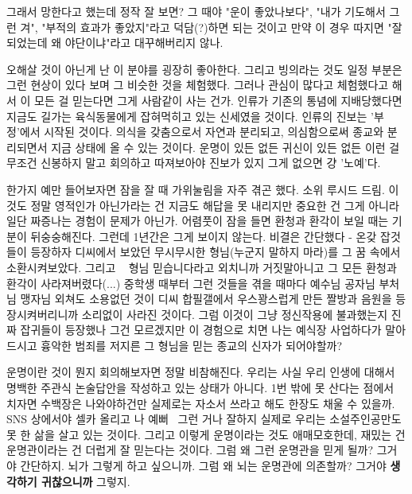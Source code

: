 그래서 망한다고 했는데 정작 잘 보면?
그 때야 "운이 좋았나보다", "내가 기도해서 그런 겨", "부적의 효과가 좋았지"라고 덕담(?)하면 되는 것이고
만약 이 경우 따지면 "잘되었는데 왜 야단이냐"라고 대꾸해버리지 않나.
\vspace{5mm}

오해살 것이 아닌게 난 이 분야를 굉장히 좋아한다. 그리고 빙의라는 것도 일정 부분은 그런 현상이 있다 보며
그 비슷한 것을 체험했다.
그러나 관심이 많다고 체험했다고 해서 이 모든 걸 믿는다면 그게 사람같이 사는 건가.
인류가 기존의 통념에 지배당했다면 지금도 길가는 육식동물에게 잡혀먹히고 있는 신세였을 것이다.
인류의 진보는 '부정'에서 시작된 것이다. 의식을 갖춤으로서 자연과 분리되고, 의심함으로써 종교와 분리되면서 지금 상태에 올 수 있는 것이다.
운명이 있든 없든 귀신이 있든 없든 이런 걸 무조건 신봉하지 말고 회의하고 따져보아야 진보가 있지 그게 없으면 걍 '노예'다.
\vspace{5mm}

한가지 예만 들어보자면 잠을 잘 때 가위눌림을 자주 겪곤 했다. 소위 루시드 드림.
이것도 정말 영적인가 아닌가라는 건 지금도 해답을 못 내리지만 중요한 건 그게 아니라 일단 짜증나는 경험이 문제가 아닌가.
어렴풋이 잠을 들면 환청과 환각이 보일 때는 기분이 뒤숭숭해진다.
그런데 1년간은 그게 보이지 않는다. 비결은 간단했다 - 온갖 잡것들이 등장하자 디씨에서 보았던 무시무시한 형님(누군지 말하지 마라)를
그 꿈 속에서 소환시켜보았다. 그리고 ~ 형님 믿습니다라고 외치니까 거짓말아니고 그 모든 환청과 환각이 사라져버렸다(...)
중학생 때부터 그런 것들을 겪을 때마다 예수님 공자님 부처님 맹자님 외쳐도 소용없던 것이
디씨 합필갤에서 우스꽝스럽게 만든 짤방과 음원을 등장시켜버리니까 소리없이 사라진 것이다.
그럼 이것이 그냥 정신작용에 불과했는지 진짜 잡귀들이 등장했나 그건 모르겠지만
이 경험으로 치면 나는 예식장 사업하다가 말아드시고 흉악한 범죄를 저지른 그 형님을 믿는 종교의 신자가 되어야할까?
\vspace{5mm}

운명이란 것이 뭔지 회의해보자면 정말 비참해진다.
우리는 사실 우리 인생에 대해서 명백한 주관식 논술답안을 작성하고 있는 상태가 아니다.
1번 밖에 못 산다는 점에서 치자면 수백장은 나와야하건만 실제로는 자소서 쓰라고 해도 한장도 채울 수 있을까.
SNS 상에서야 셀카 올리고 나 예뻐~ 그런 거나 잘하지 실제로 우리는 소설주인공만도 못 한 삶을 살고 있는 것이다.
그리고 이렇게 운명이라는 것도 애매모호한데, 재밌는 건 운명관이라는 건 더럽게 잘 믿는다는 것이다.
그럼 왜 그런 운명관을 믿게 될까?
그거야 간단하지. 뇌가 그렇게 하고 싶으니까.
그럼 왜 뇌는 운명관에 의존할까? 그거야 \textbf{생각하기 귀찮으니까} 그렇지.
\vspace{5mm}

